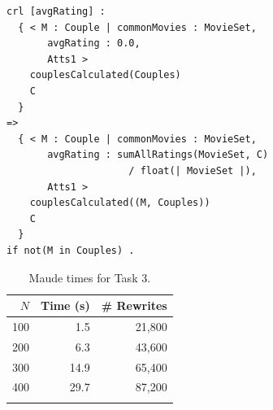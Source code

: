 \begin{lstlisting}[caption=Maude rule for Task 3 solution., label=lst:task3]
crl [avgRating] :
  { < M : Couple | commonMovies : MovieSet, 
       avgRating : 0.0, 
       Atts1 >
    couplesCalculated(Couples) 
    C 
  }
=>
  { < M : Couple | commonMovies : MovieSet, 
       avgRating : sumAllRatings(MovieSet, C) 
                     / float(| MovieSet |),
       Atts1 >
    couplesCalculated((M, Couples)) 
    C
  }
if not(M in Couples) .
\end{lstlisting}

\begin{table}
  \begin{center}
	\begin{tabular}{r r r}
	$N$ & Time (s) & \# Rewrites \\
	\hline
	100 & 1.5 & 21,800 \\
	200 & 6.3 & 43,600 \\
	300 & 14.9 & 65,400 \\
	400 & 29.7 & 87,200 \\
	\hline \\
	\end{tabular}
	\caption{Maude times for Task 3.}\label{table:maudetask3}
	\end{center}
\end{table}